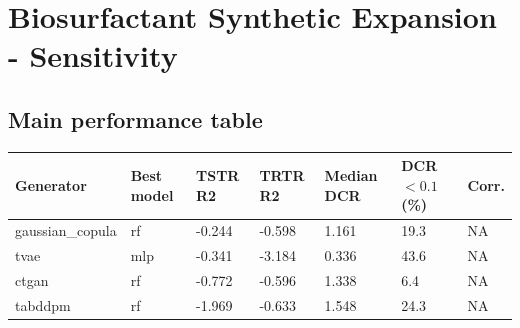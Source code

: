 \section*{Biosurfactant Synthetic Expansion - Sensitivity}

\subsection*{Main performance table}
\begin{tabular}{lllllll}
\hline
Generator & Best model & TSTR R2 & TRTR R2 & Median DCR & DCR$<0.1$ (\%) & Corr. \\
\hline
gaussian\_copula & rf & -0.244 & -0.598 & 1.161 & 19.3 & NA \\
tvae & mlp & -0.341 & -3.184 & 0.336 & 43.6 & NA \\
ctgan & rf & -0.772 & -0.596 & 1.338 & 6.4 & NA \\
tabddpm & rf & -1.969 & -0.633 & 1.548 & 24.3 & NA \\
\hline
\end{tabular}


